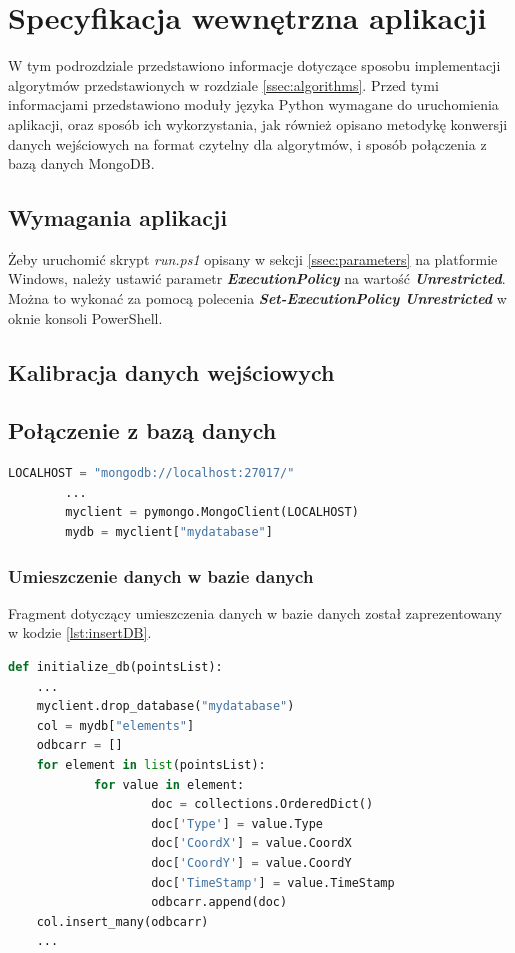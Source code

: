 \section{Specyfikacja wewnętrzna aplikacji}
\label{sec:internal}
W tym podrozdziale przedstawiono informacje dotyczące sposobu implementacji algorytmów przedstawionych w rozdziale \ref{ssec:algorithms}. Przed tymi informacjami przedstawiono moduły języka Python wymagane do uruchomienia aplikacji, oraz sposób ich wykorzystania, jak również opisano metodykę konwersji danych wejściowych na format czytelny dla algorytmów, i sposób połączenia z bazą danych MongoDB.
\subsection{Wymagania aplikacji}
\label{ssec:apprequirements}
Żeby uruchomić skrypt \emph{run.ps1} opisany w sekcji \ref{ssec:parameters} na platformie Windows, należy ustawić parametr \emph{\textbf{ExecutionPolicy}} na wartość \emph{\textbf{Unrestricted}}. Można to wykonać za pomocą polecenia \emph{\textbf{Set-ExecutionPolicy Unrestricted}} w oknie konsoli PowerShell.\par
\subsection{Kalibracja danych wejściowych}
\label{ssec:calibration}
\blindtext
\subsection{Połączenie z bazą danych}
\label{ssec:connectionDB}
\begin{lstlisting}[language=Python, caption=Połączenie z bazą danych, label={lst:connectDB}]
        LOCALHOST = "mongodb://localhost:27017/"
        ...
        myclient = pymongo.MongoClient(LOCALHOST)
        mydb = myclient["mydatabase"]
\end{lstlisting}

\subsubsection{Umieszczenie danych w bazie danych}
Fragment dotyczący umieszczenia danych w bazie danych został zaprezentowany w kodzie \ref{lst:insertDB}. 
\begin{lstlisting}[language=Python, caption=Umieszczenie danych w bazie danych, label={lst:insertDB}]
def initialize_db(pointsList):
    ...
    myclient.drop_database("mydatabase")
    col = mydb["elements"]
    odbcarr = []
    for element in list(pointsList):
            for value in element:
                    doc = collections.OrderedDict()
                    doc['Type'] = value.Type
                    doc['CoordX'] = value.CoordX
                    doc['CoordY'] = value.CoordY
                    doc['TimeStamp'] = value.TimeStamp
                    odbcarr.append(doc)
    col.insert_many(odbcarr)
    ...
\end{lstlisting}
